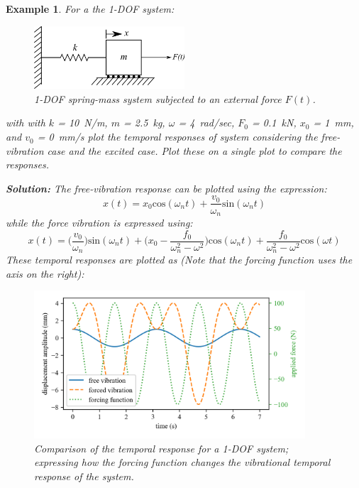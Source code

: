\documentclass[12pt,letter]{article}
\newtheorem{ex}{Example}
\numberwithin{ex}{section} %
\newenvironment{example}{\begin{mdframed}[middlelinewidth=0.5mm]\begin{ex}\normalfont}{\end{ex}\end{mdframed}}
\numberwithin{re}{section} %
\numberwithin{vcs}{section} %
\begin{document}
			\begin{example}
				For a the 1-DOF system:
				\begin{figure}[H]
					\centering
					\includegraphics[width=0.5\textwidth]{../figures/1-DOF-spring_mass_horizontal_forced.png}
					\caption{1-DOF spring-mass system subjected to an external force $F(t)$.}
				\end{figure}
				with with $k$ = 10~N/m, $m$ = 2.5~kg, $\omega$ = 4~rad/sec, $F_0$ = 0.1~kN, $x_0$ = 1~mm, and $v_0$ = 0~mm/s plot the temporal responses of system considering the free-vibration case and the excited case. Plot these on a single plot to compare the responses. 
							
				\noindent\textbf{Solution:} The free-vibration response can be plotted using the expression:
				\begin{equation}
					x(t) = x_0\text{cos}(\omega_n t) + \frac{v_0}{\omega_n}\text{sin}(\omega_n t)
				\end{equation}				
				while the force vibration is expressed using:
				\begin{equation}
					x(t) = \Big(\frac{v_0}{\omega_n}\Big)\text{sin}(\omega_n t) + \Big(x_0-\frac{f_0}{\omega_n^2-\omega^2}\Big)\text{cos}(\omega_n t) + \frac{f_0}{\omega_n^2-\omega^2}\text{cos}(\omega t)
				\end{equation}	
				These temporal responses are plotted as (Note that the forcing function uses the axis on the right):
				\begin{figure}[H]
					\centering
					\includegraphics[width=0.9\textwidth]{../figures/free_and_forced_temporal_response.png}
					\caption{Comparison of the temporal response for a 1-DOF system; expressing how the forcing function changes the vibrational  temporal response of the system.}
				\end{figure}	
			\end{example}
			
\end{document}
